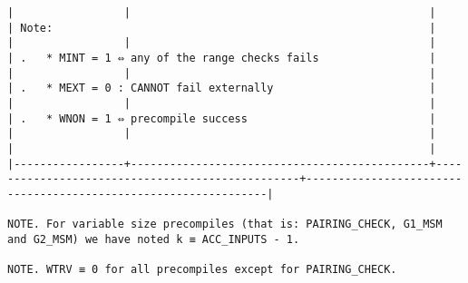 \documentclass[varwidth=\maxdimen,margin=0.5cm,multi={verbatim}]{standalone}
\begin{document}
\begin{verbatim}
|                 |                                              |                                                 | Note:                                                          |
|                 |                                              |                                                 | .   * MINT = 1 ⇔ any of the range checks fails                 |
|                 |                                              |                                                 | .   * MEXT = 0 : CANNOT fail externally                        |
|                 |                                              |                                                 | .   * WNON = 1 ⇔ precompile success                            |
|                 |                                              |                                                 |                                                                |
|-----------------+----------------------------------------------+-------------------------------------------------+----------------------------------------------------------------|

NOTE. For variable size precompiles (that is: PAIRING_CHECK, G1_MSM and G2_MSM) we have noted k ≡ ACC_INPUTS - 1.

NOTE. WTRV ≡ 0 for all precompiles except for PAIRING_CHECK.

\end{verbatim}
\end{document}
